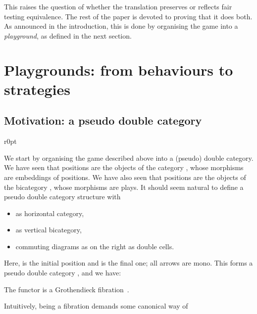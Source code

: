 \documentclass{LMCS}
\theoremstyle{plain}\newtheorem{satz}[thm]{Satz}
\begin{document}
This raises the question of whether the translation 
preserves or reflects fair testing equivalence. The rest of the paper
is devoted to proving that it does both. As announced in the
introduction, this is done by organising the game into a
\emph{playground}, as defined in the next section.

\section{Playgrounds: from behaviours to strategies}\label{sec:playgrounds}

\subsection{Motivation: a pseudo double category}\label{subsec:pseudodouble}
\begin{wrapfigure}[6]{r}{0pt}
  \begin{minipage}[c]{0.25\linewidth}
    \vspace*{-1.5em}
  \end{minipage}
\end{wrapfigure}
We start by organising the game described above into a (pseudo) double
category.  We have seen that positions are the objects of the category
, whose morphisms are embeddings of positions.  We have also
seen that positions are the objects of the bicategory , whose
morphisms are plays.  It should seem natural to define a pseudo double
category structure with
\begin{itemize}
\item  as horizontal category,
\item  as vertical bicategory,
\item commuting diagrams as on the right as double cells.
\end{itemize}
Here,  is the initial position and  is the final one;
all arrows are mono.
  This forms a pseudo double category , and we have:
\begin{prop}\label{prop:pseudodouble}
  The functor  is a Grothendieck
  fibration~\citep{Jacobs}.
\end{prop}
Intuitively,  being a fibration demands some canonical way of
\end{document}

